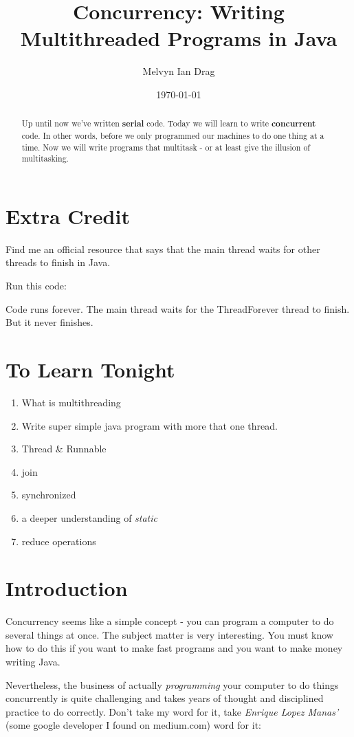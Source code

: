 \documentclass[12pt]{article}
\title{Concurrency: Writing Multithreaded Programs in Java}
\author{
	Melvyn Ian Drag
}
\date{\today}
\begin{document}
\maketitle

\begin{abstract}
Up until now we've written \textbf{serial} code. Today we will learn to write
\textbf{concurrent} code. In other words, before we only programmed our machines
to do one thing at a time. Now we will write programs that multitask - or at
least give the illusion of multitasking.
\end{abstract}

\section{Extra Credit}
Find me an official resource that says that the main thread waits for other
threads to finish in Java.

Run this code:


Code runs forever. The main thread waits for the ThreadForever thread to finish.
But it never finishes. 


\section{To Learn Tonight}
\begin{enumerate}
\item What is multithreading
\item Write super simple java program with more that one thread.
\item Thread \& Runnable
\item join
\item synchronized
\item a deeper understanding of \textit{static}
\item reduce operations
\end{enumerate}

\section{Introduction}
Concurrency seems like a simple concept - you can program a computer to do
several things at once. The subject matter is very interesting.
You must know how to do this if you want to make fast
programs and you want to make money writing Java.

Nevertheless, the business of actually \textit{programming} your computer to do
things concurrently is quite challenging and takes years of thought and
disciplined practice to do correctly. Don't take my word for it, take
\textit{Enrique Lopez Manas'} (some google developer I found on medium.com) word
for it:
\end{document}
